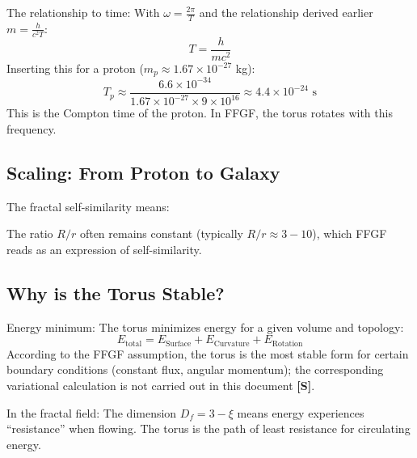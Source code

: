 The relationship to time:
With \( \omega = \frac{2\pi}{T} \) and the relationship derived earlier \( m = \frac{h}{c^2 T} \):
\[
T = \frac{h}{mc^2}
\]
Inserting this for a proton (\( m_p \approx 1.67 \times 10^{-27} \) kg):
\[
T_p \approx \frac{6.6 \times 10^{-34}}{1.67 \times 10^{-27} \times 9 \times 10^{16}} \approx 4.4 \times 10^{-24} \text{ s}
\]
This is the Compton time of the proton. In FFGF, the torus rotates with this frequency.

\subsection{Scaling: From Proton to Galaxy}
The fractal self-similarity means:
\begin{table}[H]
	\centering
\end{table}
The ratio \( R/r \) often remains constant (typically \( R/r \approx 3-10 \)), which FFGF reads as an expression of self-similarity.

\subsection{Why is the Torus Stable?}
Energy minimum:
The torus minimizes energy for a given volume and topology:
\[
E_{\text{total}} = E_{\text{Surface}} + E_{\text{Curvature}} + E_{\text{Rotation}}
\]
According to the FFGF assumption, the torus is the most stable form for certain boundary conditions (constant flux, angular momentum); the corresponding variational calculation is not carried out in this document \textbf{[S]}.

In the fractal field:
The dimension \( D_f = 3 - \xi \) means energy experiences ``resistance'' when flowing. The torus is the path of least resistance for circulating energy.

